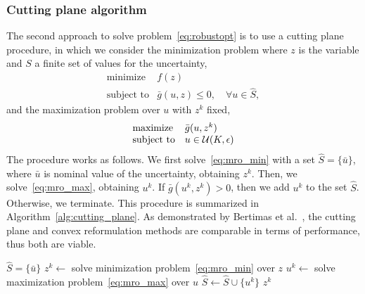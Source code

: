 \subsubsection{Cutting plane algorithm}
The second approach to solve problem~\eqref{eq:robustopt} is to use a cutting plane procedure, in which we consider the minimization problem where $z$ is the variable and $S$ a finite set of values for the uncertainty,
\begin{equation}
	\label{eq:mro_min}
	\begin{array}{ll}
		\mbox{minimize} & f(z)\\
		\mbox{subject to} & \bar{g}(u, z)  \le 0, \quad \forall u \in
		\hat{S},
		\end{array}
\end{equation}
and the maximization problem over $u$ with $z^k$ fixed,
\begin{equation}
	\label{eq:mro_max}
	\begin{array}{ll}
		\mbox{maximize} & \bar{g}(u, z^k)\\
		\mbox{subject to} & u \in {\mathcal{U}}(K, \epsilon)
	\end{array}
\end{equation}
The procedure works as follows.
We first solve~\eqref{eq:mro_min} with a set $\hat{S} = \{\bar{u}\}$, where $\bar{u}$ is nominal value of the uncertainty, obtaining $z^k$.
Then, we solve~\eqref{eq:mro_max}, obtaining $u^k$.
If $\bar{g}(u^k, z^k) > 0$, then we add $u^k$ to the set $\hat{S}$.
Otherwise, we terminate. This procedure is summarized in Algorithm~\ref{alg:cutting_plane}.
As demonstrated by Bertimas et al.~\cite{cuttingplane}, the cutting plane and convex reformulation methods are comparable in terms of performance, thus both are viable.
\begin{algorithm}
	\caption{Cutting plane algorithm to solve~\eqref{eq:robustopt}}
	\label{alg:cutting_plane}
	\begin{algorithmic}[1]
	  $\hat{S} = \{\bar{u}\}$
	 \State $z^k \gets $ solve minimization problem~\eqref{eq:mro_min} over $z$
	 \State $u^k \gets $ solve maximization problem~\eqref{eq:mro_max} over $u$
	 \State $\hat{S} \gets \hat{S} \cup \{u^k\}$
	 \Else
	  $z^k$
	 \EndIf
	 \EndFor
	\end{algorithmic}
\end{algorithm}

